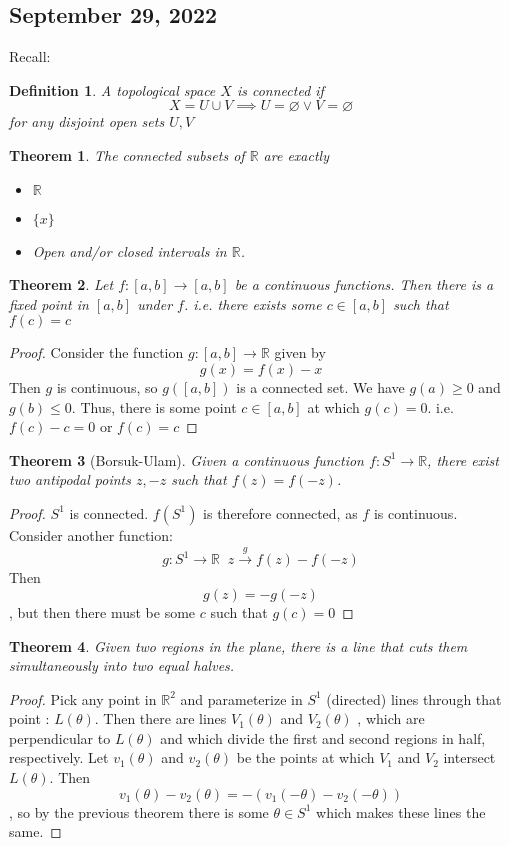 \documentclass{article}
\newcommand{\R}{\mathbb{R}}
\newtheorem{theorem}{Theorem}
\newtheorem{definition}{Definition}
\begin{document}
\subsection{September 29, 2022}
Recall:
\begin{definition}
	A topological space $X$ is connected if $$X=U\cup V\implies U=\varnothing\lor V=\varnothing$$ for any disjoint open sets $U,V$
\end{definition}
\begin{theorem}
	The connected subsets of $\R$ are exactly \begin{itemize}
		\item $\R$
		\item $\{x\}$
		\item Open and/or closed intervals in $\R$.
	\end{itemize}
\end{theorem}
\begin{theorem}
	Let $f: [a,b]\rightarrow [a,b]$ be a continuous functions.  Then there is a fixed point in $[a,b]$ under $f$.  i.e. there exists some $c\in[a,b]$ such that $f(c) = c$
\end{theorem}
\begin{proof}
	Consider the function $g: [a,b]\to\R$ given by $$g(x)=f(x)-x$$Then $g$ is continuous, so $g([a,b])$ is a connected set.  We have $g(a)\geq0$ and $g(b)\leq 0$.  Thus, there is some point $c\in[a,b]$ at which $g(c)=0$. i.e. $f(c)-c=0$ or $f(c)=c$
\end{proof}
\begin{theorem}[Borsuk-Ulam]
	Given a continuous function $f: S^1\to\R$, there exist two antipodal points $z,-z$ such that $f(z)=f(-z)$.
\end{theorem}
\begin{proof}
	$S^1$ is connected.  $f(S^1)$ is therefore connected, as $f$ is continuous.  Consider another function: $$g: S^1\to\R\;\;  z\xrightarrow{g}f(z)-f(-z)$$Then $$g(z)=-g(-z)$$, but then there must be some $c$ such that $g(c)=0$ 
\end{proof}
\begin{theorem}
	Given two regions in the plane, there is a line that cuts them simultaneously into two equal halves.
\end{theorem}
\begin{proof}
	Pick any point in $\R^{2}$ and parameterize in $S^1$ (directed) lines through that point : $L(\theta)$.  Then there are lines $V_1(\theta)$ and $V_2(\theta)$ , which are perpendicular to $L(\theta)$ and which divide the first and second regions in half, respectively.  Let $v_1(\theta)$ and $v_2(\theta)$ be the points at which $V_1$ and $V_2$ intersect $L(\theta)$.  Then $$v_1(\theta)-v_2(\theta)=-(v_1(-\theta)-v_2(-\theta))$$, so by the previous theorem there is some $\theta\in S^1$ which makes these lines the same.
\end{proof}
\end{document}
